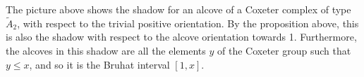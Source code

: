 \documentclass[11pt]{article}
\begin{document}
\begin{example}
    The picture above shows the shadow for an alcove of a Coxeter complex of type $\tilde{A}_2$, with respect to the trivial positive orientation. By the proposition above, this is also the shadow with respect to the alcove orientation towards 1. Furthermore, the alcoves in this shadow are all the elements $y$ of the Coxeter group such that $y\leq x$, and so it is the Bruhat interval $[1,x]$. 
\end{example}















\end{document}
